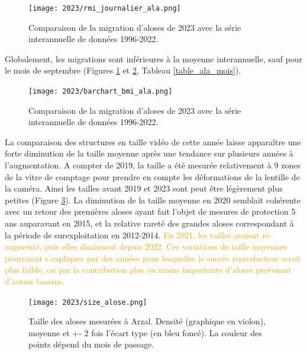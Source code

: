 \documentclass[11pt,twocolumn,titlepage,twoside]{article}\usepackage[]{graphicx}\usepackage[]{color}
\newcommand{\rev}[2][orange]{\textcolor{#1}{#2}}
\begin{document}

 


\begin{figure}[htpb]
\centering
\texttt{[image: 2023/rmi\_journalier\_ala.png]} 
\caption{Comparaison de la migration d'aloses de 2023 avec la série
interannuelle de données 1996-2022.}
\label{rmi_journalier_ala}
\end{figure}


Globalement, les migrations sont inférieures à la
moyenne interannuelle, sauf pour le mois de septembre (Figures
\ref{rmi_journalier_ala} et \ref{barchart_bmi_ala}, Tableau \ref{table_ala_mois}).

\begin{figure}[htpb]
\centering
\texttt{[image: 2023/barchart\_bmi\_ala.png]} 
\caption{Comparaison de la migration d'aloses de 2023 avec la série
interannuelle de données 1996-2022.}
\label{barchart_bmi_ala}
\end{figure}

La comparaison des structures en taille vidéo de cette année laisse apparaître
une forte diminution de la taille moyenne après une tendance sur plusieurs
années à l'augmentation.
A compter de 2019, la taille a été mesurée relativement à 9 zones de la vitre de
comptage pour prendre en compte les déformations de la lentille de la caméra. Ainsi les tailles avant 2019 et 2023
sont peut être légèrement plus petites (Figure \ref{size_alose}).
La diminution de la taille moyenne en 2020 semblait cohérente avec un retour des
premières aloses ayant fait l'objet de mesures de protection 5 ans auparavant en
2015, et la relative rareté des grandes aloses correspondant à la période de
surexploitation en 2012-2014. \rev{En 2021, les tailles avaient ré-augmenté,
puis elles diminuent depuis 2022. Ces variations de taille moyennes
pourraient s'expliquer par des années pour lesquelles le succès reproducteur
serait plus faible, ou par la contribution plus ou moins importante d'aloses
provenant d'autres bassins.}



\begin{figure}[htpb]
\centering
\texttt{[image: 2023/size\_alose.png]}
\caption{Taille des aloses mesurées à Arzal. Densité (graphique en violon),
moyenne et +- 2 fois l'écart type (en bleu foncé). La couleur des points dépend
du mois de passage.}
\label{size_alose}
\end{figure}
\end{document}
